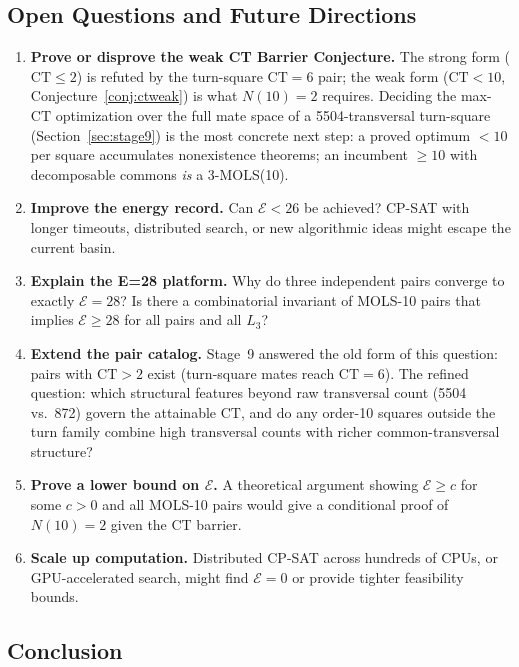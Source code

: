 \documentclass[11pt,a4paper]{article}
\theoremstyle{remark}
\newcommand{\CT}{\mathrm{CT}}
\newcommand{\E}{\mathcal{E}}
\begin{document}
\subsection{Open Questions and Future Directions}

\begin{enumerate}
  \item \textbf{Prove or disprove the weak CT Barrier Conjecture.} The strong form
    ($\CT \leq 2$) is refuted by the turn-square $\CT=6$ pair; the weak form
    ($\CT < 10$, Conjecture~\ref{conj:ctweak}) is what $N(10)=2$ requires. Deciding
    the max-$\CT$ optimization over the full mate space of a 5504-transversal
    turn-square (Section~\ref{sec:stage9}) is the most concrete next step: a proved
    optimum $<10$ per square accumulates nonexistence theorems; an incumbent
    $\geq 10$ with decomposable commons \emph{is} a 3-MOLS(10).

  \item \textbf{Improve the energy record.} Can $\E < 26$ be achieved? CP-SAT with
    longer timeouts, distributed search, or new algorithmic ideas might escape the
    current basin.

  \item \textbf{Explain the E=28 platform.} Why do three independent pairs converge
    to exactly $\E=28$? Is there a combinatorial invariant of MOLS-10 pairs that
    implies $\E \geq 28$ for all pairs and all $L_3$?

  \item \textbf{Extend the pair catalog.} Stage~9 answered the old form of this
    question: pairs with $\CT > 2$ exist (turn-square mates reach $\CT = 6$).
    The refined question: which structural features beyond raw transversal count
    (5504 vs.\ 872) govern the attainable $\CT$, and do any order-10 squares
    outside the turn family combine high transversal counts with richer
    common-transversal structure?

  \item \textbf{Prove a lower bound on $\E$.} A theoretical argument showing $\E \geq c$
    for some $c > 0$ and all MOLS-10 pairs would give a conditional proof of $N(10)=2$
    given the CT barrier.

  \item \textbf{Scale up computation.} Distributed CP-SAT across hundreds of CPUs, or
    GPU-accelerated search, might find $\E=0$ or provide tighter feasibility bounds.
\end{enumerate}

\subsection{Conclusion}
\end{document}
